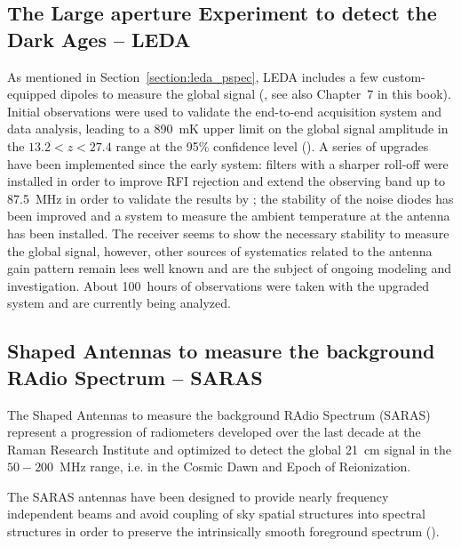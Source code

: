 \subsection{The Large aperture Experiment to detect the Dark Ages -- LEDA}
\label{leda_global}
As mentioned in Section~\ref{section:leda_pspec}, LEDA includes a few custom-equipped dipoles to measure the global signal (\cite{price18}, see also Chapter~7 in this book). Initial observations were used to validate the end-to-end acquisition system and data analysis, leading to a 890~mK upper limit on the global signal amplitude in the $13.2 < z < 27.4$ range at the 95\% confidence level (\cite{bernardi16}). A series of upgrades have been implemented since the early system: filters with a sharper roll-off were installed in order to improve RFI rejection and extend the observing band up to 87.5~MHz in order to validate the results by \cite{bowman18}; the stability of the noise diodes has been improved and a system to measure the ambient temperature at the antenna has been installed. The receiver seems to show the necessary stability to measure the global signal, however, other sources of systematics related to the antenna gain pattern remain lees well known and are the subject of ongoing modeling and investigation.
%
About 100~hours of observations were taken with the upgraded system and are currently being analyzed.
%


\subsection{Shaped Antennas to measure the background RAdio Spectrum -- SARAS}

The Shaped Antennas to measure the background RAdio Spectrum (SARAS) represent a progression of radiometers developed over the last decade at the Raman Research Institute and optimized to detect the global 21~cm signal in the $50-200$~MHz range, i.e. in the Cosmic Dawn and Epoch of Reionization.

The SARAS antennas have been designed to provide nearly frequency independent beams and avoid coupling of sky spatial structures into spectral structures in order to preserve the intrinsically smooth foreground spectrum (\cite{sathyanarayana17}).

